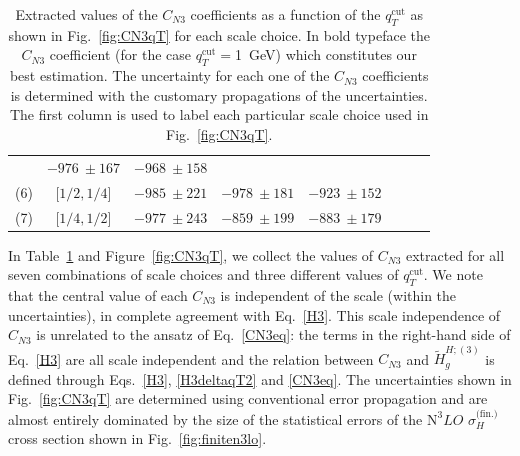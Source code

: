 \documentclass[12pt]{article}
\DeclareRobustCommand{\qtcut}{\ensuremath{q_T^\mathrm{cut}}\xspace}
\DeclareRobustCommand{\fin}{\text{(fin.)}\xspace}
\DeclareRobustCommand{\N}[1]{\ensuremath{\text{N}^{#1}}} %
\begin{document}
\begin{table}
\begin{tabular}{ |c|c||c|c|c|c|c|c| }
& $ -976~\pm 167$%

& $ -968~\pm 158$%

 \\
 
\multirow{1}{*}{(6)} 

& $ \big[1/2,1/4 \big]$

& $ -985~\pm 221$ %

& $ -978~\pm 181$%

& $-923~\pm 152$%

\\

\multirow{1}{*}{(7)} 

& $\big[1/4,1/2 \big]$

& $ -977~\pm 243$ %

& $ -859~\pm 199$%

& $ -883~\pm 179$%
\\

\hline

\end{tabular}

\caption{\label{Table:CN3values}
{Extracted values of the $C_{N3}$ coefficients as a function of the $\qtcut$ as shown in Fig.~\ref{fig:CN3qT} for each scale choice. In bold typeface the $C_{N3}$ coefficient (for the case $\qtcut=$1~GeV) which constitutes our best estimation. The uncertainty for each one of the $C_{N3}$ coefficients is determined with the customary propagations of the uncertainties. The first column is used to label each particular scale choice used in Fig.~\ref{fig:CN3qT}.
}
}
\renewcommand{\arraystretch}{1}
\end{table}

In Table~\ref{Table:CN3values} and Figure~\ref{fig:CN3qT},
we collect the values of $C_{N3}$ extracted for all seven combinations of scale 
choices and three different values of $\qtcut$. 
We note that the central value of each $C_{N3}$ is independent of the scale (within the uncertainties), in complete agreement with Eq.~\eqref{H3}. This scale independence of $C_{N3}$ is unrelated to the ansatz of Eq.~\eqref{CN3eq}: the terms in the right-hand side of Eq.~\eqref{H3} are all scale independent and the relation between $C_{N3}$ and $\widetilde{H}^{H;(3)}_{g}$ is defined through Eqs.~\eqref{H3}, \eqref{H3deltaqT2} and \eqref{CN3eq}. The uncertainties shown in Fig.~\ref{fig:CN3qT} are determined using conventional error propagation and are almost entirely dominated by the size of the statistical errors of the $\N3LO$ $\sigma_{H}^{\fin}$ cross section shown in Fig.~\ref{fig:finiten3lo}.
\end{document}
